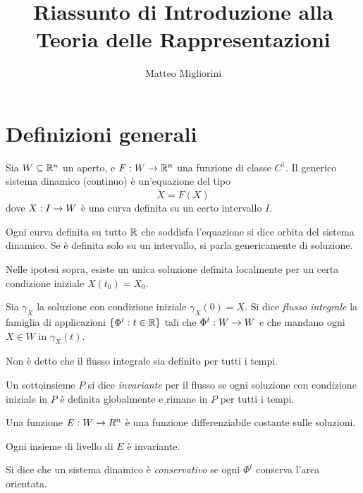 \documentclass[a4paper,10pt,oneside]{math_article}
\title{Riassunto di Introduzione alla Teoria delle Rappresentazioni}
\author{Matteo Migliorini}
\date{}
\begin{document}
	\section{Definizioni generali}
	
	Sia $W \subseteq \mathbb R^n$ un aperto, e $F: W \rightarrow \mathbb R^n$ una funzione di classe $C^1$. Il generico sistema dinamico (continuo) è un'equazione del tipo
	\[
		\dot X = F(X)
	\]
	dove $X: I \rightarrow W$ è una curva definita su un certo intervallo $I$.
	
	\begin{mydef}[Orbita]
		Ogni curva definita su tutto $\mathbb R$ che soddisfa l'equazione si dice orbita del sistema dinamico. Se è definita solo su un intervallo, si parla genericamente di soluzione.
	\end{mydef}
	
	\begin{mytheorem}
		Nelle ipotesi sopra, esiste un unica soluzione definita localmente per un certa condizione iniziale $X(t_0)=X_0$.
	\end{mytheorem}

	
	\begin{mydef}
		Sia $\gamma_{X}$ la soluzione con condizione iniziale $\gamma_X(0) = X$.
		Si dice \emph{flusso integrale} la famiglia di applicazioni $\{ \Phi^t: t \in \mathbb R\}$ tali che $\Phi^t: W\rightarrow W$ e che mandano ogni $X \in W$ in $\gamma_{X}(t)$.
	\end{mydef}
	
	\begin{myobs}
		Non è detto che il flusso integrale sia definito per tutti i tempi.
	\end{myobs}
	
	\begin{mydef}
		Un sottoinsieme $P$ si dice \emph{invariante} per il flusso se ogni soluzione con condizione iniziale in $P$ è definita globalmente e rimane in $P$ per tutti i tempi.
	\end{mydef}

	
	
	\begin{mydef}
		Una funzione $E: W \rightarrow R^n$ è una funzione differenziabile costante sulle soluzioni.
	\end{mydef}

	\begin{myobs}
		Ogni insieme di livello di $E$ è invariante.
	\end{myobs}
	
	
	\begin{mydef}
		Si dice che un sistema dinamico è \emph{conservativo} se ogni $\Phi^t$ conserva l'area orientata.
	\end{mydef}
	
\end{document}
